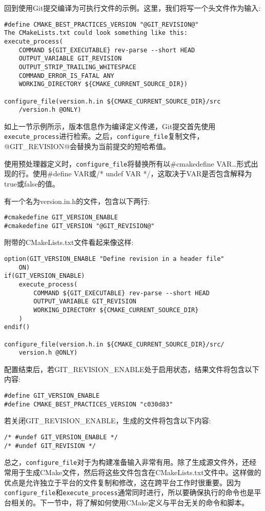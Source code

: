 回到使用Git提交编译为可执行文件的示例。这里，我们将写一个头文件作为输入:

\begin{lstlisting}[style=styleCMake]
#define CMAKE_BEST_PRACTICES_VERSION "@GIT_REVISION@"
The CMakeLists.txt could look something like this:
execute_process(
	COMMAND ${GIT_EXECUTABLE} rev-parse --short HEAD
	OUTPUT_VARIABLE GIT_REVISION
	OUTPUT_STRIP_TRAILING_WHITESPACE
	COMMAND_ERROR_IS_FATAL ANY
	WORKING_DIRECTORY ${CMAKE_CURRENT_SOURCE_DIR})

configure_file(version.h.in ${CMAKE_CURRENT_SOURCE_DIR}/src
	/version.h @ONLY)
\end{lstlisting}

如上一节示例所示，版本信息作为编译定义传递，Git提交首先使用\texttt{execute\_process}进行检索。之后，\texttt{configure\_file}复制文件，@GIT\_REVISION@会替换为当前提交的短哈希值。

使用预处理器定义时，\texttt{configure\_file}将替换所有以\#cmakedefine VAR…形式出现的行。使用\#define VAR或/* undef VAR */，这取决于VAR是否包含解释为true或false的值。

有一个名为version.in.h的文件，包含以下两行:

\begin{lstlisting}[style=styleCMake]
#cmakedefine GIT_VERSION_ENABLE
#cmakedefine GIT_VERSION "@GIT_REVISION@"
\end{lstlisting}

附带的CMakeLists.txt文件看起来像这样:

\begin{lstlisting}[style=styleCMake]
option(GIT_VERSION_ENABLE "Define revision in a header file"
	ON)
if(GIT_VERSION_ENABLE)
	execute_process(
		COMMAND ${GIT_EXECUTABLE} rev-parse --short HEAD
		OUTPUT_VARIABLE GIT_REVISION
		WORKING_DIRECTORY ${CMAKE_CURRENT_SOURCE_DIR}
	)
endif()

configure_file(version.h.in ${CMAKE_CURRENT_SOURCE_DIR}/src/
	version.h @ONLY)
\end{lstlisting}

配置结束后，若GIT\_REVISION\_ENABLE处于启用状态，结果文件将包含以下内容:

\begin{lstlisting}[style=styleCXX]
#define GIT_VERSION_ENABLE
#define CMAKE_BEST_PRACTICES_VERSION "c030d83"
\end{lstlisting}

若关闭GIT\_REVISION\_ENABLE，生成的文件将包含以下内容:

\begin{lstlisting}[style=styleCXX]
/* #undef GIT_VERSION_ENABLE */
/* #undef GIT_REVISION */
\end{lstlisting}

总之，\texttt{configure\_file}对于为构建准备输入非常有用。除了生成源文件外，还经常用于生成CMake文件，然后将这些文件包含在CMakeLists.txt文件中。这样做的优点是允许独立于平台的文件复制和修改，这在跨平台工作时很重要。因为\texttt{configure\_file}和\texttt{execute\_process}通常同时进行，所以要确保执行的命令也是平台相关的。下一节中，将了解如何使用CMake定义与平台无关的命令和脚本。






















